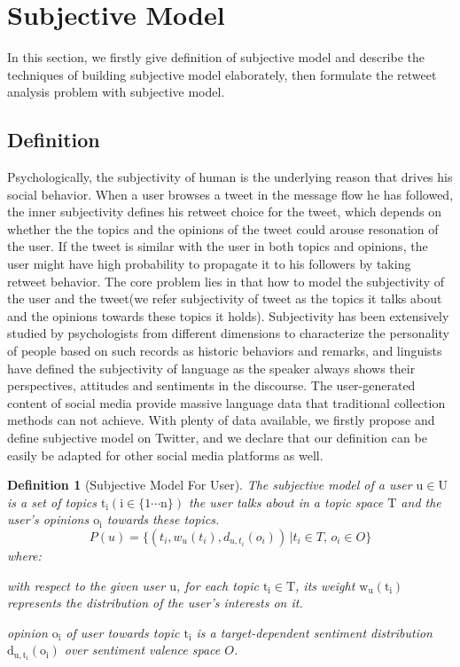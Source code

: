\documentclass{acm_proc_article-sp}
\newtheorem{definition}{Definition}
\begin{document}
\section{Subjective Model}
\label{subjectivemodel}
In this section, we firstly give definition of subjective model and describe the techniques of building subjective model elaborately, then formulate the retweet analysis problem with subjective model.
\subsection{Definition}
\label{definition}
Psychologically, the subjectivity of human is the underlying reason that drives his social behavior.
When a user browses a tweet in the message flow he has followed, the inner subjectivity defines his retweet choice for the tweet, which depends on whether the the topics and the opinions of the tweet could arouse resonation of the user.
If the tweet is similar with the user in both topics and opinions, the user might have high probability to propagate it to his followers by taking retweet behavior. 
The core problem lies in that how to model the subjectivity of the user and the tweet(we refer subjectivity of tweet as the topics it talks about and the opinions towards these topics it holds). 
Subjectivity has been extensively studied by psychologists from different dimensions to characterize the personality of people based on such records as historic behaviors and remarks\cite{Engbert2007}, and linguists have defined the subjectivity of language as the speaker always shows their perspectives, attitudes and sentiments in the discourse\cite{stein2005subjectivity}. 
The user-generated content of social media provide massive language data that traditional collection methods can not achieve.
With plenty of data available, we firstly propose and define subjective model on Twitter, and we declare that our definition can be easily be adapted for other social media platforms as well.
\begin{definition}[Subjective Model For User]
The subjective model of a user $\mathrm{u \in U}$ is a set of topics $\mathrm{t_{i} \left( i \in \lbrace1 \cdots n \rbrace \right) }$ 
the user talks about in a topic space $\mathrm{T}$ and the user's opinions $\mathrm{o_{i}}$ towards these topics.
\begin{equation}
\label{usermodel}
P \left( u \right) = \lbrace \left( t_{i}, w_{u} \left( t_{i} \right), d_{u,t_{i}} \left( o_{i} \right) \right) \,\vert  t_{i} \in T, \, o_{i} \in O \rbrace
\end{equation}
where:
\begin{itemize*}
\item with respect to the given user $\mathrm{u}$,  for each topic $\mathrm{t_{i} \in T}$, its  weight $\mathrm{ w_{u} \left( t_{i} \right)}$ represents the distribution of the user's interests on it.
\item opinion $\mathrm{o_{i}}$ of user towards topic $\mathrm{t_{i}}$ is a target-dependent sentiment distribution  $\mathrm{d_{u,t_{i}} \left( o_{i} \right)}$ over sentiment valence space $O$.
\end{itemize*}
\end{definition}
\end{document}
